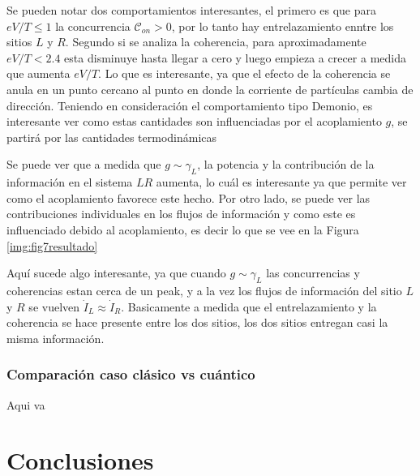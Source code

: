 Se pueden notar dos comportamientos interesantes, el primero es que para $eV/T \leq 1$ la concurrencia $\mathcal{C}_{on}>0$, por lo tanto hay entrelazamiento enntre los sitios $L$ y $R$. Segundo si se analiza la coherencia, para aproximadamente $eV/T<2.4$ esta disminuye hasta llegar a cero y luego empieza a crecer a medida que aumenta $eV/T$. Lo que es interesante, ya que el efecto de la coherencia se anula en un punto cercano al punto en donde la corriente de partículas cambia de dirección. Teniendo en consideración el comportamiento tipo Demonio, es interesante ver como estas cantidades son influenciadas por el acoplamiento $g$, se partirá por las cantidades termodinámicas 


Se puede ver que a medida que $g\sim \gamma_{L}$, la potencia y la contribución de la información en el sistema $LR$ aumenta, lo cuál es interesante ya que permite ver como el acoplamiento favorece este hecho. Por otro lado, se puede ver las contribuciones individuales en los flujos de información y como este es influenciado debido al acoplamiento, es decir lo que se vee en la Figura \ref{img:fig7resultado}


Aquí sucede algo interesante, ya que cuando $g\sim \gamma_{L}$ las concurrencias y coherencias estan cerca de un peak, y a la vez los flujos de información del sitio $L$ y $R$ se vuelven $\dot{I}_{L} \approx \dot{I}_{R}$. Basicamente a medida que el entrelazamiento y la coherencia se hace presente entre los dos sitios, los dos sitios entregan casi la misma información.


\subsection{Comparación caso clásico vs cuántico}
Aqui va

\chapter{Conclusiones}



